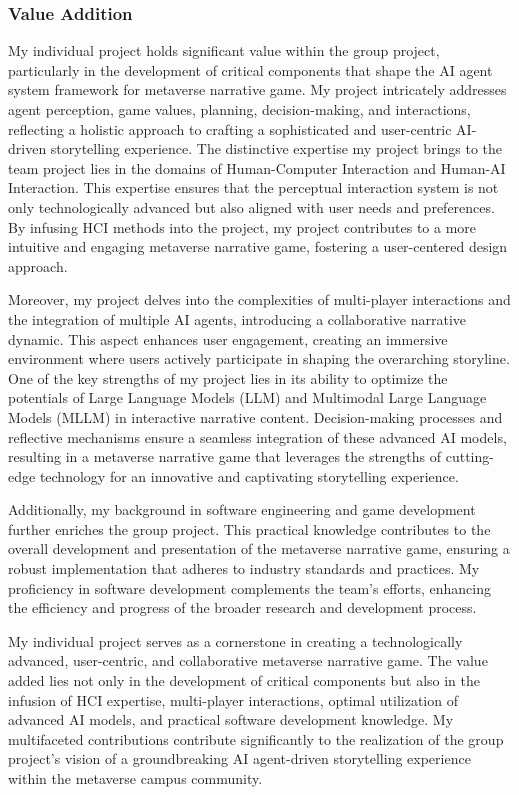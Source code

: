 \subsubsection{Value Addition}
My individual project holds significant value within the group project, particularly in the development of critical components that shape the AI agent system framework for metaverse narrative game. 
My project intricately addresses agent perception, game values, planning, decision-making, and interactions, reflecting a holistic approach to crafting a sophisticated and user-centric AI-driven storytelling experience. 
The distinctive expertise my project brings to the team project lies in the domains of Human-Computer Interaction and Human-AI Interaction. 
This expertise ensures that the perceptual interaction system is not only technologically advanced but also aligned with user needs and preferences. 
By infusing HCI methods into the project, my project contributes to a more intuitive and engaging metaverse narrative game, fostering a user-centered design approach.

Moreover, my project delves into the complexities of multi-player interactions and the integration of multiple AI agents, 
introducing a collaborative narrative dynamic. This aspect enhances user engagement, creating an immersive environment where users actively participate in shaping the overarching storyline. 
One of the key strengths of my project lies in its ability to optimize the potentials of Large Language Models (LLM) and Multimodal Large Language Models (MLLM) in interactive narrative content. 
Decision-making processes and reflective mechanisms ensure a seamless integration of these advanced AI models, resulting in a metaverse narrative game that leverages the strengths of cutting-edge technology for an innovative and captivating storytelling experience.

Additionally, my background in software engineering and game development further enriches the group project. 
This practical knowledge contributes to the overall development and presentation of the metaverse narrative game, ensuring a robust implementation that adheres to industry standards and practices. 
My proficiency in software development complements the team's efforts, enhancing the efficiency and progress of the broader research and development process.

My individual project serves as a cornerstone in creating a technologically advanced, user-centric, and collaborative metaverse narrative game. 
The value added lies not only in the development of critical components but also in the infusion of HCI expertise, multi-player interactions, optimal utilization of advanced AI models, and practical software development knowledge. 
My multifaceted contributions contribute significantly to the realization of the group project's vision of a groundbreaking AI agent-driven storytelling experience within the metaverse campus community.

